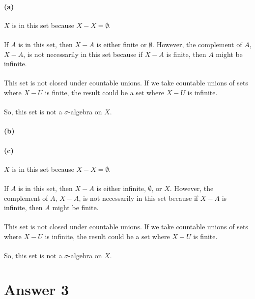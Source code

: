 \documentclass[12pt]{article}
\begin{document}
\paragraph{(a)}
\(X\) is in this set because \(X - X = \emptyset\). \\
\\
If \(A\) is in this set, then \(X - A\) is either finite or \(\emptyset\). However, the complement of \(A\), \(X - A\), is not necessarily in this set because if \(X - A\) is finite, then \(A\) might be infinite.
\\ \\
This set is not closed under countable unions. If we take countable unions of sets where \(X - U\) is finite, the result could be a set where \(X - U\) is infinite.
\\ \\
So, this set is not a \(\sigma\)-algebra on \(X\).
\paragraph{(b)}
\paragraph{(c)}
\(X\) is in this set because \(X - X = \emptyset\).\\
\\
If \(A\) is in this set, then \(X - A\) is either infinite, \(\emptyset\), or \(X\). However, the complement of \(A\), \(X - A\), is not necessarily in this set because if \(X - A\) is infinite, then \(A\) might be finite.
\\ \\
This set is not closed under countable unions. If we take countable unions of sets where \(X - U\) is infinite, the result could be a set where \(X - U\) is finite.
\\ \\
So, this set is not a \(\sigma\)-algebra on \(X\).
\\

\section*{Answer 3}
\end{document}
